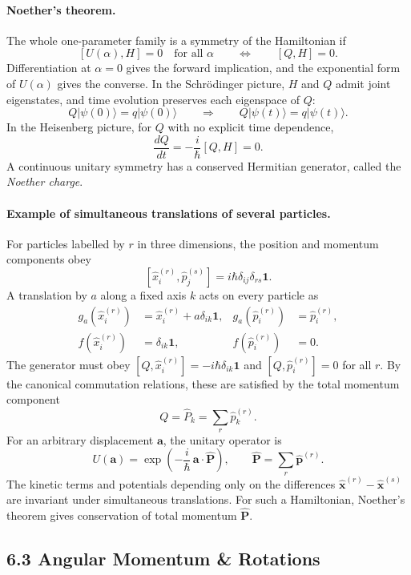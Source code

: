 \documentclass[11pt,a4paper]{article}
\begin{document}
\paragraph{Noether's theorem.}
The whole one-parameter family is a symmetry of the Hamiltonian if
\[
    [U(\alpha),H]=0\quad\text{for all }\alpha
    \qquad\Longleftrightarrow\qquad [Q,H]=0.
\]
Differentiation at $\alpha=0$ gives the forward implication, and the
exponential form of $U(\alpha)$ gives the converse. In the
Schr\"odinger picture, $H$ and $Q$ admit joint eigenstates, and time
evolution preserves each eigenspace of $Q$:
\[
    Q|\psi(0)\rangle=q|\psi(0)\rangle
    \qquad\Longrightarrow\qquad Q|\psi(t)\rangle=q|\psi(t)\rangle.
\]
In the Heisenberg picture, for $Q$ with no explicit time dependence,
\[
    \frac{dQ}{dt}=-\frac{i}{\hbar}[Q,H]=0.
\]
A continuous unitary symmetry has a conserved Hermitian generator,
called the \emph{Noether charge}.

\paragraph{Example of simultaneous translations of several particles.}
For particles labelled by $r$ in three dimensions, the position and
momentum components obey
\[
    [\hat x_i^{(r)},\hat p_j^{(s)}]
        =i\hbar\delta_{ij}\delta_{rs}\mathbf 1.
\]
A translation by $a$ along a fixed axis $k$ acts on every particle as
\begin{align*}
    g_a(\hat x_i^{(r)})&=\hat x_i^{(r)}+a\delta_{ik}\mathbf 1,
    & g_a(\hat p_i^{(r)})&=\hat p_i^{(r)},\\
    f(\hat x_i^{(r)})&=\delta_{ik}\mathbf 1,
    & f(\hat p_i^{(r)})&=0.
\end{align*}
The generator must obey $[Q,\hat x_i^{(r)}]=-i\hbar\delta_{ik}\mathbf 1$
and $[Q,\hat p_i^{(r)}]=0$ for all $r$. By the canonical commutation
relations, these are satisfied by the total momentum component
\[
    Q=\hat P_k=\sum_r\hat p_k^{(r)}.
\]
For an arbitrary displacement $\mathbf a$, the unitary operator is
\[
    U(\mathbf a)=\exp\!\left(-\frac{i}{\hbar}\,
        \mathbf a\cdot\hat{\mathbf P}\right),
    \qquad \hat{\mathbf P}=\sum_r\hat{\mathbf p}^{(r)}.
\]
The kinetic terms and potentials depending only on the differences
$\hat{\mathbf x}^{(r)}-\hat{\mathbf x}^{(s)}$ are invariant under
simultaneous translations. For such a Hamiltonian, Noether's theorem
gives conservation of total momentum $\hat{\mathbf P}$.

\subsection*{6.3 Angular Momentum \& Rotations}
\end{document}
